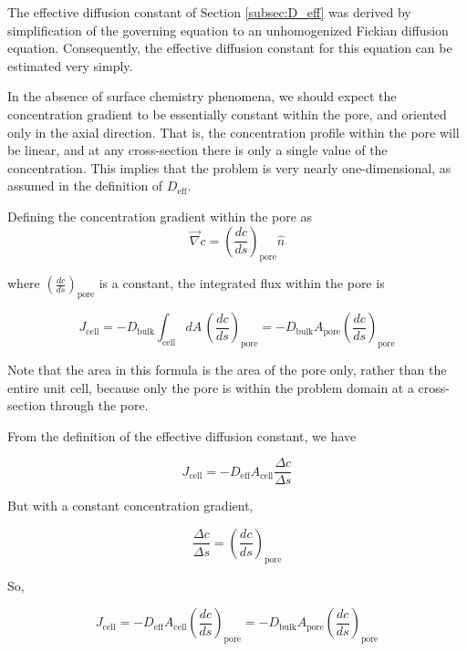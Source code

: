 \documentclass{article}
\begin{document}
The effective diffusion constant of Section \ref{subsec:D_eff}
was derived by simplification of the governing equation
to an unhomogenized Fickian diffusion equation.
Consequently, the effective diffusion constant for this equation
can be estimated very simply.

In the absence of surface chemistry phenomena,
we should expect the concentration gradient
to be essentially constant within the pore, and oriented only in the axial direction.
That is, the concentration profile within the pore will be linear,
and at any cross-section there is only a single value of the concentration.
This implies that the problem is very nearly one-dimensional,
as assumed in the definition of $D_{\mathrm{eff}}$.

Defining the concentration gradient within the pore as
\begin{equation}\vec{\nabla} c = \left(\frac{dc}{ds}\right)_{\mathrm{pore}} \hat{n}\end{equation}

where $\left(\frac{dc}{ds}\right)_{\mathrm{pore}}$ is a constant,
the integrated flux within the pore is

\begin{equation}J_\mathrm{cell} = -D_\mathrm{bulk} \int_\mathrm{cell} dA\, \left(\frac{dc}{ds}\right)_{\mathrm{pore}}
 = -D_\mathrm{bulk} A_\mathrm{pore} \left(\frac{dc}{ds}\right)_{\mathrm{pore}}\end{equation}

Note that the area in this formula is the area of the pore only,
rather than the entire unit cell, because only the pore is within the problem domain
at a cross-section through the pore.

From the definition of the effective diffusion constant, we have

\begin{equation}J_{\mathrm{cell}} = - D_{\mathrm{eff}} A_{\mathrm{cell}} \frac{\Delta c}{\Delta s}\end{equation}

But with a constant concentration gradient,

\begin{equation}\frac{\Delta c}{\Delta s} = \left(\frac{dc}{ds}\right)_{\mathrm{pore}}\end{equation}

So,

\begin{equation}J_{\mathrm{cell}} = - D_{\mathrm{eff}} A_{\mathrm{cell}} \left(\frac{dc}{ds}\right)_{\mathrm{pore}}
 = -D_\mathrm{bulk} A_\mathrm{pore} \left(\frac{dc}{ds}\right)_{\mathrm{pore}}\end{equation}
\end{document}
